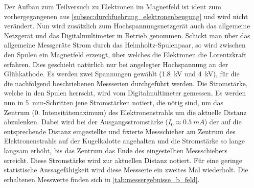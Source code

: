 \documentclass[ngerman]{scrartcl}
\begin{document}
Der Aufbau zum Teilversuch zu Elektronen im Magnetfeld ist ident zum vorhergegangenen aus \autoref{subsec:durchfuehrung_elektronenbeugung} und wird nicht verändert. Nun wird zusätzlich zum Hochspannungsnetzgerät auch das allgemeine Netzgerät und das Digitalmultimeter in Betrieb genommen. Schickt man über das allgemeine Messgeräte Strom %
durch das Helmholtz-Spulenpaar, so wird zwischen den Spulen ein Magnetfeld erzeugt, über welches die Elektronen die Lorentzkraft erfahren. Dies geschieht natürlich nur bei angelegter Hochspannung an der Glühkathode. Es werden zwei Spannungen gewählt (\SI{1.8}{kV} und \SI{4}{kV}), für die die nachfolgend beschriebenen Messserien durchgeführt werden. Die Stromstärke, welche in den Spulen herrscht, wird vom Digitalmultimeter gemessen. Es werden nun in \SI{5}{mm}-Schritten jene Stromstärken notiert, die nötig sind, um das Zentrum (0. Intensitätsmaximum) des Elektronenstrahls um die aktuelle Distanz abzulenken. Dabei wird bei der Ausgangsstromstärke ($I_0 \approx \SI{0.5}{mA}$) der auf die entsprechende Distanz eingestellte und fixierte Messschieber am Zentrum des Elektronenstrahls auf der Kugelkalotte angehalten und die Stromstärke so lange langsam erhöht, bis das Zentrum das Ende des eingestellten Messschiebers erreicht. Diese Stromstärke wird zur aktuellen Distanz notiert. Für eine geringe statistische Aussagefähigkeit wird diese Messserie ein zweites Mal wiederholt. Die erhaltenen Messwerte finden sich in \autoref{tab:messergebnisse_b_feld}.
%
\end{document}
